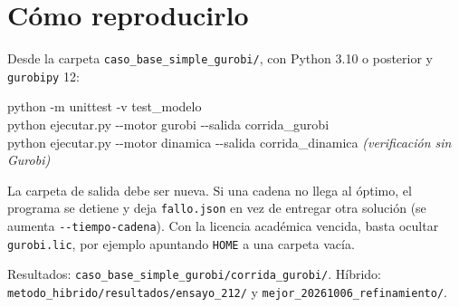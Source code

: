 \documentclass[fontsize=10.5pt,a4paper]{scrartcl}
\newcommand{\arch}[1]{\texttt{#1}}
\begin{document}
\section{Cómo reproducirlo}

Desde la carpeta \arch{caso\_base\_simple\_gurobi/}, con Python 3.10 o posterior y \arch{gurobipy} 12:
\begin{tcolorbox}[colback=softrow,colframe=softrow,sharp corners,boxrule=0pt,left=7pt,top=2pt,bottom=2pt,fontupper=\small\ttfamily]
python -m unittest -v test\_modelo\\
python ejecutar.py -{}-motor gurobi -{}-salida corrida\_gurobi\\
python ejecutar.py -{}-motor dinamica -{}-salida corrida\_dinamica \textrm{\textit{\color{slate}(verificación sin Gurobi)}}
\end{tcolorbox}
La carpeta de salida debe ser nueva. Si una cadena no llega al óptimo, el programa se detiene y deja \arch{fallo.json} en vez de entregar otra solución (se aumenta \arch{-{}-tiempo-cadena}). Con la licencia académica vencida, basta ocultar \arch{gurobi.lic}, por ejemplo apuntando \texttt{HOME} a una carpeta vacía.

{\footnotesize\raggedright\color{slate} Resultados: \arch{caso\_base\_simple\_gurobi/corrida\_gurobi/}. Híbrido: \arch{metodo\_hibrido/resultados/ensayo\_212/} y \arch{mejor\_20261006\_refinamiento/}.\par}
\end{document}
